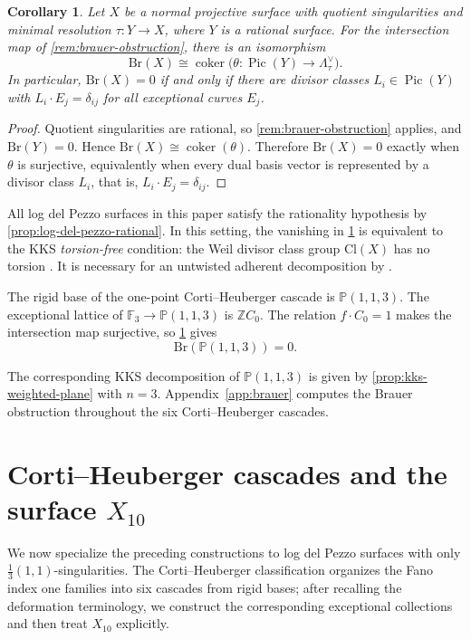 \documentclass[11pt]{article}
\theoremstyle{plain}
\newtheorem{corollary}[corollary]{Corollary}
\theoremstyle{definition}
\theoremstyle{remark}
\newcommand{\Pp}{\mathbb P}
\newcommand{\F}{\mathbb F}
\newcommand{\Z}{\mathbb Z}
\newcommand{\Pic}{\operatorname{Pic}}
\newcommand{\Cl}{\mathrm{Cl}}
\newcommand{\Br}{\mathrm{Br}}
\begin{document}
\begin{corollary}\label{cor:brauer-cokernel}
Let \(X\) be a normal projective surface with quotient singularities and
minimal resolution \(\tau:Y\to X\), where \(Y\) is a rational surface. For the intersection map of
\cref{rem:brauer-obstruction}, there is an isomorphism
\[
\Br(X)\cong\operatorname{coker}
\bigl(\theta:\Pic(Y)\longrightarrow\Lambda_\tau^\vee\bigr).
\]
In particular, \(\Br(X)=0\) if and only if there are divisor classes
\(L_i\in\Pic(Y)\) with \(L_i\cdot E_j=\delta_{ij}\) for all exceptional
curves \(E_j\).
\end{corollary}

\begin{proof}
Quotient singularities are rational, so \cref{rem:brauer-obstruction}
applies, and \(\Br(Y)=0\). Hence
\(\Br(X)\cong\operatorname{coker}(\theta)\). Therefore \(\Br(X)=0\)
exactly when \(\theta\) is surjective, equivalently when every dual basis
vector is represented by a divisor class \(L_i\), that is,
\(L_i\cdot E_j=\delta_{ij}\).
\end{proof}

All log del Pezzo surfaces in this paper satisfy the rationality hypothesis
by \cref{prop:log-del-pezzo-rational}. In this setting, the vanishing in
\cref{cor:brauer-cokernel} is equivalent to the KKS \emph{torsion-free}
condition: the Weil divisor class group \(\Cl(X)\) has no torsion
\cite[Definition~4.7]{KKS2020}. It is necessary for an untwisted adherent
decomposition by \cite[Corollary~4.8]{KKS2020}.

The rigid base of the one-point Corti--Heuberger cascade is
\(\Pp(1,1,3)\). The exceptional lattice of
\(\F_3\to\Pp(1,1,3)\) is \(\Z C_0\). The relation
\(f\cdot C_0=1\) makes the intersection map surjective, so
\cref{cor:brauer-cokernel} gives
\[
\Br(\Pp(1,1,3))=0.
\]

The corresponding KKS decomposition of \(\Pp(1,1,3)\) is given by
\cref{prop:kks-weighted-plane} with \(n=3\).
Appendix~\ref{app:brauer} computes the Brauer obstruction throughout
the six Corti--Heuberger cascades.

\section{Corti--Heuberger cascades and the surface \texorpdfstring{$X_{10}$}{X10}}
\label{sec:cascade}

We now specialize the preceding constructions to log del Pezzo surfaces
with only \(\frac13(1,1)\)-singularities. The Corti--Heuberger
classification organizes the Fano index one families into six cascades
from rigid bases; after recalling the deformation terminology, we construct
the corresponding exceptional collections and then treat \(X_{10}\)
explicitly.
\end{document}
